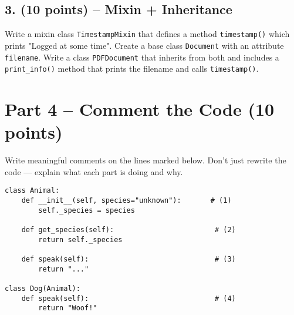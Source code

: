 \documentclass[11pt]{article}
\begin{document}
\vspace{6cm}
\newpage

\subsection*{3. (10 points) – Mixin + Inheritance}

Write a mixin class \texttt{TimestampMixin} that defines a method \texttt{timestamp()} which prints "Logged at some time". Create a base class \texttt{Document} with an attribute \texttt{filename}. Write a class \texttt{PDFDocument} that inherits from both and includes a \texttt{print\_info()} method that prints the filename and calls \texttt{timestamp()}.

\vspace{6cm}

\newpage

\section*{Part 4 – Comment the Code (10 points)}

Write meaningful comments on the lines marked below. Don’t just rewrite the code — explain what each part is doing and why.

\begin{verbatim}
class Animal:
    def __init__(self, species="unknown"):       # (1)
        self._species = species

    def get_species(self):                        # (2)
        return self._species

    def speak(self):                              # (3)
        return "..."

class Dog(Animal):
    def speak(self):                              # (4)
        return "Woof!"
\end{verbatim}

\vspace{5cm}
\end{document}
